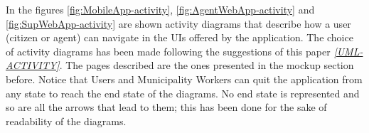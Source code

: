\documentclass[a4paper]{report}
\begin{document}
In the figures \ref{fig:MobileApp-activity}, \ref{fig:AgentWebApp-activity} and \ref{fig:SupWebApp-activity} are shown activity diagrams that describe how a user (citizen or agent) can navigate in the UIs offered by the application. The choice of activity diagrams has been made following the suggestions of this paper \label{use:UML-Activity} \hyperref[ref:UML-Activity]{\textit{[UML-ACTIVITY]}}. The pages described are the ones presented in the mockup section before.
Notice that  Users and Municipality Workers can quit the application from any state to reach the end state of the diagrams. No end state is represented and so are all the arrows that lead to them; this has been done for the sake of readability of the diagrams.
\end{document}
